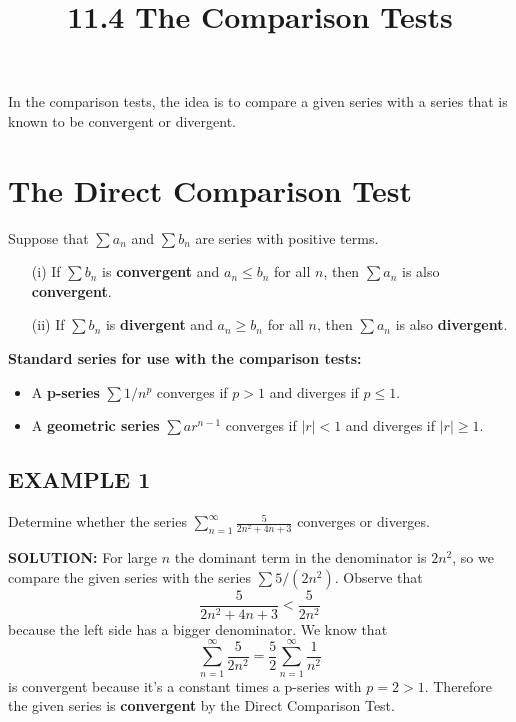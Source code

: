\documentclass{article}
\title{11.4 The Comparison Tests}
\date{}
\author{}
\theoremstyle{mystyle}
\begin{document}
\maketitle

In the comparison tests, the idea is to compare a given series with a series that is known to be convergent or divergent.

\section*{The Direct Comparison Test}

\begin{tcolorbox}[
    colback=white,
    colframe=orange!80!white,
    title=The Direct Comparison Test,
    boxrule=0.5mm,
    arc=3mm
    ]
    Suppose that \( \sum a_n \) and \( \sum b_n \) are series with positive terms.
    \begin{itemize}
        \item[(i)] If \( \sum b_n \) is \textbf{convergent} and \( a_n \le b_n \) for all \( n \), then \( \sum a_n \) is also \textbf{convergent}.
        \item[(ii)] If \( \sum b_n \) is \textbf{divergent} and \( a_n \ge b_n \) for all \( n \), then \( \sum a_n \) is also \textbf{divergent}.
    \end{itemize}
    \textbf{Standard series for use with the comparison tests:}
    \begin{itemize}
        \item A \textbf{p-series} \( \sum 1/n^p \) converges if \( p > 1 \) and diverges if \( p \le 1 \).
        \item A \textbf{geometric series} \( \sum ar^{n-1} \) converges if \( |r| < 1 \) and diverges if \( |r| \ge 1 \).
    \end{itemize}
\end{tcolorbox}

\subsection*{EXAMPLE 1}
Determine whether the series \( \sum_{n=1}^{\infty} \frac{5}{2n^2 + 4n + 3} \) converges or diverges.

\textbf{SOLUTION:}
For large $n$ the dominant term in the denominator is $2n^2$, so we compare the given series with the series $\sum 5/(2n^2)$. Observe that
\[ \frac{5}{2n^2 + 4n + 3} < \frac{5}{2n^2} \]
because the left side has a bigger denominator. We know that
\[ \sum_{n=1}^{\infty} \frac{5}{2n^2} = \frac{5}{2} \sum_{n=1}^{\infty} \frac{1}{n^2} \]
is convergent because it's a constant times a p-series with $p = 2 > 1$. Therefore the given series is \textbf{convergent} by the Direct Comparison Test.
\end{document}
